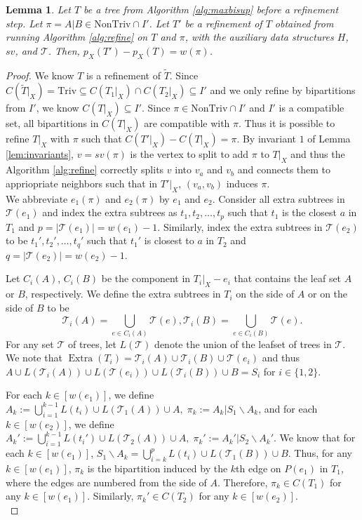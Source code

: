 \documentclass{bmcart}
\newcommand{\triv}{\mathrm{Triv}}
\newcommand{\ntriv}{\mathrm{NonTriv}}
\DeclareMathOperator*{\extra}{Extra}
\newtheorem{lemma}{Lemma}
\begin{document}
\begin{lemma}\label{lem:refine_achieves_weight}
Let $T$ be a tree from Algorithm \ref{alg:maxbisup} before a refinement step. Let $\pi = A|B \in \ntriv \cap I'$. Let $T'$ be a refinement of $T$ obtained from running Algorithm \ref{alg:refine} on $T$ and $\pi$, with the auxiliary data structures $H$, $sv$, and $\mathcal{T}$. Then, $p_X(T') - p_X(T) = w(\pi)$. 
\end{lemma}
\begin{proof}
    We know $T$ is a refinement of $\tilde{T}$. Since $C(\tilde{T}|_X) = \triv \subseteq C(T_1|_X) \cap C(T_2|_X) \subseteq I'$ and we only refine by bipartitions from $I'$, we know $C(T|_X) \subseteq I'$. Since $\pi \in \ntriv \cap I'$ and $I'$ is a compatible set, all bipartitions in $C(T|_X)$ are compatible with $\pi$. Thus it is possible to refine $T|_X$ with $\pi$ such that $C(T'|_X) - C(T|_X) = \pi$. By invariant $1$ of Lemma \ref{lem:invariants}, $v = sv(\pi)$ is the vertex to split to add $\pi$ to $T|_X$ and thus the Algorithm \ref{alg:refine} correctly splits $v$ into $v_a$ and $v_b$ and connects them to appriopriate neighbors such that in $T'|_X$, $(v_a,v_b)$ induces $\pi$.\\

    We abbreviate $e_1(\pi)$ and $e_2(\pi)$ by $e_1$ and $e_2$.  Consider all extra subtrees in $\mathcal{T}(e_1)$ and index the extra subtrees as $t_1, t_2, \dots, t_p$ such that $t_1$ is the closest $a$ in $T_1$ and $p = |\mathcal{T}(e_1)| = w(e_1)-1$. Similarly, index the extra subtrees in $\mathcal{T}(e_2)$ to be $t_1', t_2', \dots, t_q'$ such that $t_1'$ is closest to $a$ in $T_2$ and $q = |\mathcal{T}(e_2)| = w(e_2)-1$. 

    Let $C_i(A)$, $C_i(B)$ be the component in $T_i|_X - e_i$ that contains the leaf set $A$ or $B$, respectively. We define the extra subtrees in $T_i$ on the side of $A$ or on the side of $B$ to be \[\mathcal{T}_i(A) = \bigcup_{e \in C_i(A)} \mathcal{T}(e), \mathcal{T}_i(B) = \bigcup_{e \in C_i(B)} \mathcal{T}(e). \]
    For any set $\mathcal{T}$ of trees, let $L(\mathcal{T})$ denote the union of the leafset of trees in $\mathcal{T}$. We note that $\extra(T_i) = \mathcal{T}_i(A) \cup \mathcal{T}_i(B) \cup \mathcal{T}(e_i)$ and thus $A \cup L(\mathcal{T}_i(A)) \cup L(\mathcal{T}(e_i)) \cup L(\mathcal{T}_i(B)) \cup B = S_i$ for $i \in \{1,2\}$. 

    For each $k \in [w(e_1)]$, we define
    $A_k := \bigcup_{i = 1}^{k-1} L(t_i) \cup L(\mathcal{T}_1(A)) \cup A,\; \pi_k := A_k | S_1 \backslash A_k$, and for each $k \in [w(e_2)]$, we define
    $A_k' := \bigcup_{i = 1}^{k-1} L(t_i') \cup L(\mathcal{T}_2(A)) \cup A,\; \pi_k' := A_k' | S_2 \backslash A_k'$.
    We know that for each $k \in [w(e_1)]$, $S_1 \backslash A_k = \bigcup_{i = k}^{p} L(t_i) \cup L(\mathcal{T}_1(B)) \cup B$. Thus, for any $k \in [w(e_1)]$, $\pi_k$ is the bipartition induced by the $k$th edge on $P(e_1)$ in $T_1$, where the edges are numbered from the side of $A$. Therefore, $\pi_k \in C(T_1)$ for any $k \in [w(e_1)]$. Similarly, $\pi_k' \in C(T_2)$  for any $k \in [w(e_2)]$. \\


\end{proof}
\end{document}
